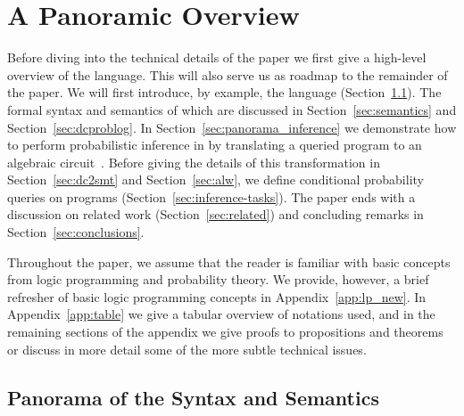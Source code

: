 \section{A Panoramic Overview}
\label{sec:panorama}

Before diving into the technical details of the paper we first give a high-level overview of the \dcproblogsty language. This will also serve us as roadmap to the remainder of the paper.  
We will first introduce, by example, the \dcproblogsty language (Section~\ref{sec:panorama_semantics}). The formal syntax and semantics of which are discussed in Section~\ref{sec:semantics} and Section~\ref{sec:dcproblog}.
In Section~\ref{sec:panorama_inference} we demonstrate how to perform probabilistic inference in \dcproblogsty by translating a queried \dcproblogsty program to an algebraic circuit~\citep{zuidbergdosmartires2019transforming}. 
Before giving the details of this transformation in Section~\ref{sec:dc2smt} and Section~\ref{sec:alw}, we define conditional probability queries on \dcproblogsty programs (Section~\ref{sec:inference-tasks}).
The paper ends with a discussion on related work (Section~\ref{sec:related}) and concluding remarks in Section~\ref{sec:conclusions}.

Throughout the paper, we assume that the reader is familiar with basic concepts from logic programming and probability theory. We provide, however, a brief refresher of basic logic programming concepts in Appendix~\ref{app:lp_new}. In Appendix~\ref{app:table} we give a tabular overview of notations used, and in the remaining sections of the appendix we give proofs to propositions and theorems or discuss in more detail some of the more subtle technical issues.

\subsection{Panorama of the Syntax and Semantics}
\label{sec:panorama_semantics}


